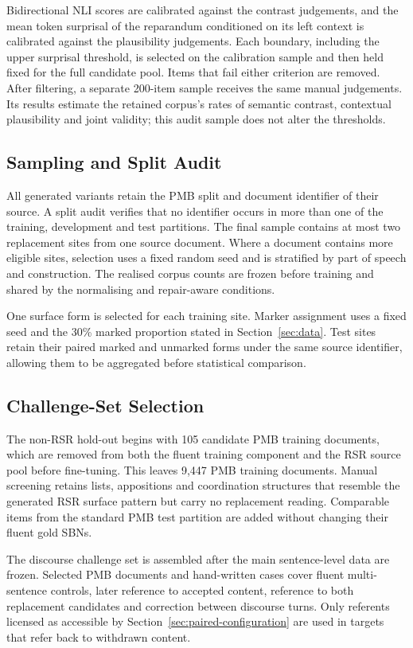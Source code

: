 \documentclass{article}
\begin{document}
Bidirectional NLI scores are calibrated against the contrast judgements, and
the mean token surprisal of the reparandum conditioned on its left context is
calibrated against the plausibility judgements. Each boundary, including the
upper surprisal threshold, is selected on the calibration sample and then held
fixed for the full candidate pool. Items that fail either criterion are
removed. After filtering, a separate 200-item sample receives the same manual
judgements. Its results estimate the retained corpus's rates of semantic
contrast, contextual plausibility and joint validity; this audit sample does
not alter the thresholds.

\subsection{Sampling and Split Audit}

All generated variants retain the PMB split and document identifier of their
source. A split audit verifies that no identifier occurs in more than one of
the training, development and test partitions. The final sample contains at
most two replacement sites from one source document. Where a document contains more
eligible sites, selection uses a fixed random seed and is stratified by part
of speech and construction. The realised corpus counts are frozen
before training and shared by the normalising and repair-aware conditions.

One surface form is selected for each training site. Marker assignment uses a
fixed seed and the 30\% marked proportion stated in Section~\ref{sec:data}. Test
sites retain their paired marked and unmarked forms under the same source
identifier, allowing them to be aggregated before statistical comparison.

\subsection{Challenge-Set Selection}

The non-RSR hold-out begins with 105 candidate PMB training documents,
which are removed from both the fluent training component and the RSR source
pool before fine-tuning. This leaves 9,447 PMB training documents. Manual
screening retains lists, appositions and coordination structures that resemble
the generated RSR surface pattern but carry no replacement reading. Comparable
items from the standard PMB test partition are added without changing their
fluent gold SBNs.

The discourse challenge set is assembled after the main sentence-level data
are frozen. Selected PMB documents and hand-written cases cover fluent
multi-sentence controls, later reference to accepted content, reference to
both replacement candidates and correction between discourse turns. Only
referents licensed as accessible by Section~\ref{sec:paired-configuration} are
used in targets that refer back to withdrawn content.
\end{document}

